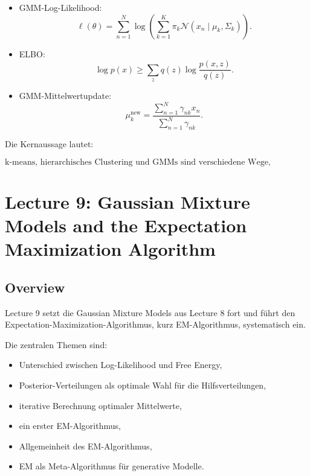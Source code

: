 \documentclass[11pt,a4paper]{scrartcl}
\begin{document}
\begin{answerbox}
\begin{itemize}
        \item GMM-Log-Likelihood:
        \[
            \ell(\theta)
            =
            \sum_{n=1}^{N}
            \log
            \left(
                \sum_{k=1}^{K}
                \pi_k
                \mathcal{N}(x_n\mid \mu_k,\Sigma_k)
            \right).
        \]

        \item ELBO:
        \[
            \log p(x)
            \geq
            \sum_z
            q(z)
            \log
            \frac{p(x,z)}{q(z)}.
        \]

        \item GMM-Mittelwertupdate:
        \[
            \mu_k^{\mathrm{new}}
            =
            \frac{
                \sum_{n=1}^{N}
                \gamma_{nk}x_n
            }{
                \sum_{n=1}^{N}
                \gamma_{nk}
            }.
        \]
    \end{itemize}

    Die Kernaussage lautet:

    \[
        \boxed{
            \text{k-means, hierarchisches Clustering und GMMs sind verschiedene
            Wege, Gruppenstruktur in ungelabelten Daten zu modellieren.}
        }
    \]
\end{answerbox}

\section{Lecture 9: Gaussian Mixture Models and the Expectation Maximization Algorithm}

\subsection{Overview}

\begin{notebox}
    Lecture 9 setzt die Gaussian Mixture Models aus Lecture 8 fort und führt
    den Expectation-Maximization-Algorithmus, kurz EM-Algorithmus, systematisch
    ein.

    Die zentralen Themen sind:

    \begin{itemize}
        \item Unterschied zwischen Log-Likelihood und Free Energy,
        \item Posterior-Verteilungen als optimale Wahl für die Hilfsverteilungen,
        \item iterative Berechnung optimaler Mittelwerte,
        \item ein erster EM-Algorithmus,
        \item Allgemeinheit des EM-Algorithmus,
        \item EM als Meta-Algorithmus für generative Modelle.
    \end{itemize}
\end{notebox}
\end{document}
